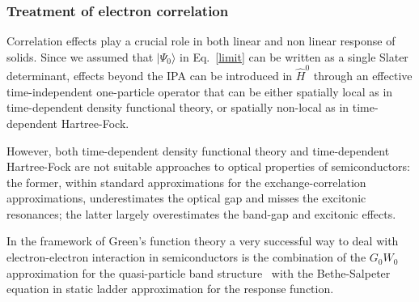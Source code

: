 \subsubsection{Treatment of electron correlation}\label{ss:correff}
Correlation effects play a crucial role in both linear\cite{Onida} and non linear\cite{PhysRevB.82.235201,PhysRevB.80.155205} response of solids. %
Since we assumed that $|\Psi_0\rangle$ in Eq.~\eqref{limit} can be written as a single Slater determinant, effects beyond the IPA can be introduced in $\hat H^0$ through an effective time-independent one-particle operator that can be either spatially local as in time-dependent density functional theory, or spatially non-local as in time-dependent Hartree-Fock. 

However, both time-dependent density functional theory and time-dependent Hartree-Fock are not suitable approaches to optical properties of semiconductors: the former, within standard approximations for the exchange-correlation approximations, underestimates the optical gap and misses the excitonic resonances; the latter largely overestimates the band-gap and excitonic effects.   

In the framework of Green's function theory a very successful way to deal with electron-electron interaction in semiconductors is the combination of the $G_0W_0$ approximation for the quasi-particle band structure~\cite{PhysRevB.25.2867} with the Bethe-Salpeter equation in static ladder approximation for the response function.~\cite{strinati}  

